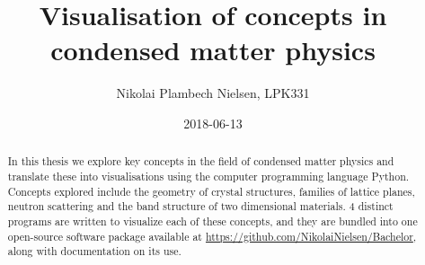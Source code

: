 \documentclass[a4paper,11pt]{article}
\title{Visualisation of concepts in condensed matter physics}
\author{Nikolai Plambech Nielsen, LPK331}
\date{2018-06-13}
\numberwithin{equation}{section}
\begin{document}
	
	
	
	
	\begin{abstract}
		In this thesis we explore key concepts in the field of condensed matter physics and translate these into visualisations using the computer programming language Python. Concepts explored include the geometry of crystal structures, families of lattice planes, neutron scattering and the band structure of two dimensional materials. 4 distinct programs are written to visualize each of these concepts, and they are bundled into one open-source software package available at \url{https://github.com/NikolaiNielsen/Bachelor}, along with documentation on its use.
	\end{abstract}
	\tableofcontents
	
	\newpage
	
	\setcounter{page}{1}
	
	
	
	
	
	
	
	
	
	
	
	
	
	\newpage
	\appendix
	
	
\end{document}
